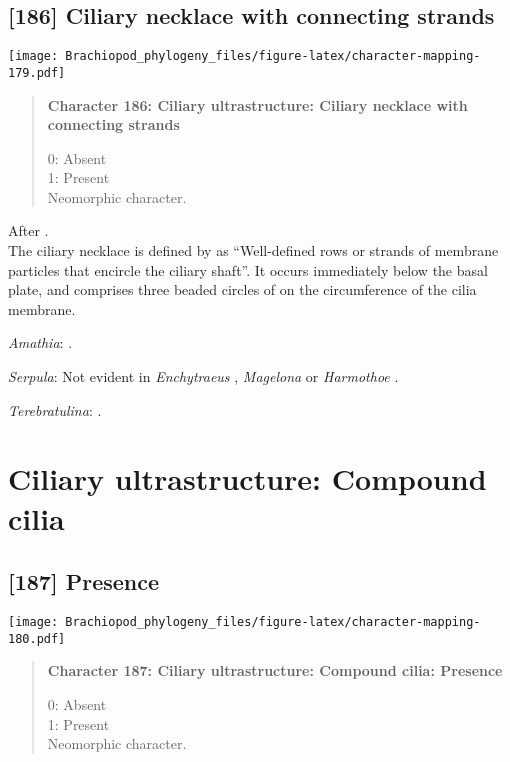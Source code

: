 \documentclass[openany]{book}
\theoremstyle{definition}
\theoremstyle{definition}
\theoremstyle{definition}
\theoremstyle{remark}
\begin{document}
\subsection*{{[}186{]} Ciliary necklace with connecting
strands}\label{ciliary-necklace-with-connecting-strands}

\texttt{[image: Brachiopod\_phylogeny\_files/figure-latex/character-mapping-179.pdf]}

\begin{quote}
\textbf{Character 186: Ciliary ultrastructure: Ciliary necklace with
connecting strands}

0: Absent\\
1: Present\\
Neomorphic character.
\end{quote}

After \citet{Lundin2009}.\\
The ciliary necklace is defined by \citet{Gilula1972} as ``Well-defined
rows or strands of membrane particles that encircle the ciliary shaft''.
It occurs immediately below the basal plate, and comprises three beaded
circles of on the circumference of the cilia membrane.

\hypertarget{Amathia-coding-186}{}
\emph{Amathia}: \citet{Reed1982}.

\hypertarget{Serpula-coding-186}{}
\emph{Serpula}: Not evident in \emph{Enchytraeus} \citep{Reger1967},
\emph{Magelona} \citep{Bartolomaeus1995} or \emph{Harmothoe}
\citep{Holborow1969}.

\hypertarget{Terebratulina-coding-186}{}
\emph{Terebratulina}: \citep{Luter1995}.

\section{Ciliary ultrastructure: Compound
cilia}\label{ciliary-ultrastructure-compound-cilia}

\subsection*{{[}187{]} Presence}\label{presence-3}

\texttt{[image: Brachiopod\_phylogeny\_files/figure-latex/character-mapping-180.pdf]}

\begin{quote}
\textbf{Character 187: Ciliary ultrastructure: Compound cilia: Presence}

0: Absent\\
1: Present\\
Neomorphic character.
\end{quote}
\end{document}
